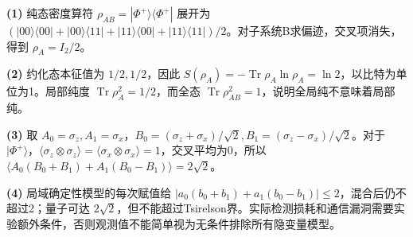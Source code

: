 \par\noindent\textbf{(1)} 纯态密度算符 \(\rho_{AB}=|\Phi^+\rangle\langle\Phi^+|\) 展开为 \((|00\rangle\langle00|+|00\rangle\langle11|+|11\rangle\langle00|+|11\rangle\langle11|)/2\)。对子系统B求偏迹，交叉项消失，得到 \(\rho_A=I_2/2\)。
\par\noindent\textbf{(2)} 约化态本征值为 \(1/2,1/2\)，因此 \(S(\rho_A)=-\operatorname{Tr}\rho_A\ln\rho_A=\ln2\)，以比特为单位为1。局部纯度 \(\operatorname{Tr}\rho_A^2=1/2\)，而全态 \(\operatorname{Tr}\rho_{AB}^2=1\)，说明全局纯不意味着局部纯。
\par\noindent\textbf{(3)} 取 \(A_0=\sigma_z,A_1=\sigma_x\)，\(B_0=(\sigma_z+\sigma_x)/\sqrt2,B_1=(\sigma_z-\sigma_x)/\sqrt2\)。对于 \(|\Phi^+\rangle\)，\(\langle\sigma_z\otimes\sigma_z\rangle=\langle\sigma_x\otimes\sigma_x\rangle=1\)，交叉平均为0，所以 \(\langle A_0(B_0+B_1)+A_1(B_0-B_1)\rangle=2\sqrt2\)。
\par\noindent\textbf{(4)} 局域确定性模型的每次赋值给 \(|a_0(b_0+b_1)+a_1(b_0-b_1)|\le2\)，混合后仍不超过2；量子可达 \(2\sqrt2\)，但不能超过Tsirelson界。实际检测损耗和通信漏洞需要实验额外条件，否则观测值不能简单视为无条件排除所有隐变量模型。
